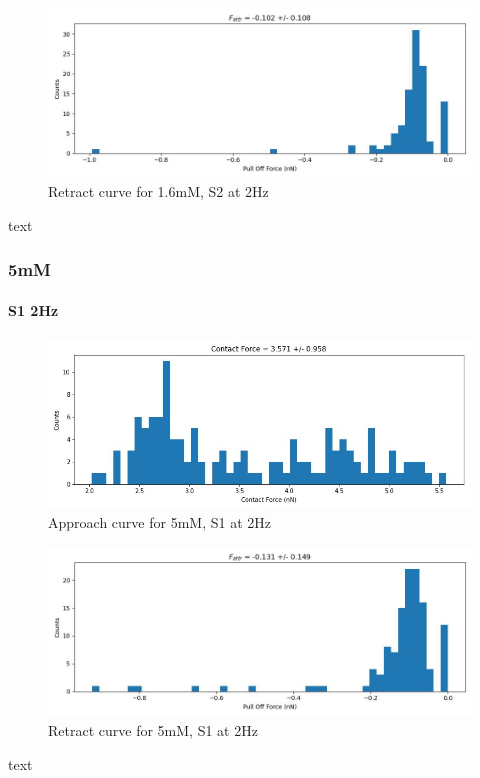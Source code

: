 \begin{figure}[h!]
\centering
\includegraphics[width=\textwidth]{chapter7/Tip speed/1.6mM/S1 2Hz/retract_f_a_hist.jpg}
\caption{Retract curve for 1.6mM, S2 at 2Hz}
\end{figure}
text
\newpage

\subsubsection*{5mM}
\paragraph{S1 2Hz}
\begin{figure}[h!]
\centering
\includegraphics[width=\textwidth]{chapter7/Tip speed/5mM/S1 2Hz/approach_f_c_hist.jpg}
\caption{Approach curve for 5mM, S1 at 2Hz}
\end{figure}

\begin{figure}[h!]
\centering
\includegraphics[width=\textwidth]{chapter7/Tip speed/5mM/S1 2Hz/retract_f_a_hist.jpg}
\caption{Retract curve for 5mM, S1 at 2Hz}
\end{figure}
text
\newpage

